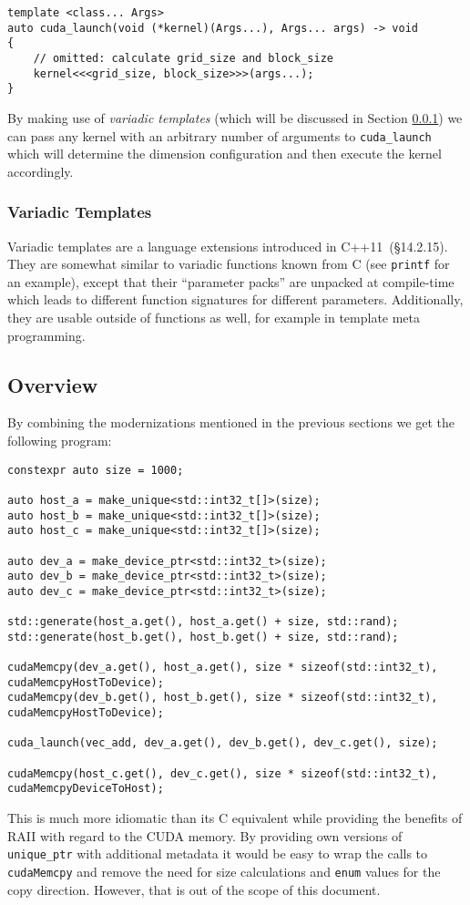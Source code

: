 \begin{lstlisting}
template <class... Args>
auto cuda_launch(void (*kernel)(Args...), Args... args) -> void
{
    // omitted: calculate grid_size and block_size
    kernel<<<grid_size, block_size>>>(args...);
}
\end{lstlisting}

By making use of \textit{variadic templates} (which will be discussed in Section \ref{vec_add:variadic_templates}) we can pass any kernel with an arbitrary number of arguments to \texttt{cuda\_launch} which will determine the dimension configuration and then execute the kernel accordingly.

\subsubsection{Variadic Templates}\label{vec_add:variadic_templates}

Variadic templates are a language extensions introduced in C++11~\cite{cpp11std}(§14.2.15). They are somewhat similar to variadic functions known from C (see \texttt{printf} for an example), except that their ``parameter packs'' are unpacked at compile-time which leads to different function signatures for different parameters. Additionally, they are usable outside of functions as well, for example in template meta programming.

\subsection{Overview}

By combining the modernizations mentioned in the previous sections we get the following program:

\begin{lstlisting}
constexpr auto size = 1000;

auto host_a = make_unique<std::int32_t[]>(size);
auto host_b = make_unique<std::int32_t[]>(size);
auto host_c = make_unique<std::int32_t[]>(size);

auto dev_a = make_device_ptr<std::int32_t>(size);
auto dev_b = make_device_ptr<std::int32_t>(size);
auto dev_c = make_device_ptr<std::int32_t>(size);

std::generate(host_a.get(), host_a.get() + size, std::rand);
std::generate(host_b.get(), host_b.get() + size, std::rand);

cudaMemcpy(dev_a.get(), host_a.get(), size * sizeof(std::int32_t), cudaMemcpyHostToDevice);
cudaMemcpy(dev_b.get(), host_b.get(), size * sizeof(std::int32_t), cudaMemcpyHostToDevice);

cuda_launch(vec_add, dev_a.get(), dev_b.get(), dev_c.get(), size);

cudaMemcpy(host_c.get(), dev_c.get(), size * sizeof(std::int32_t), cudaMemcpyDeviceToHost);
\end{lstlisting}

This is much more idiomatic than its C equivalent while providing the benefits of RAII with regard to the CUDA memory. By providing own versions of \texttt{unique\_ptr} with additional metadata it would be easy to wrap the calls to \texttt{cudaMemcpy} and remove the need for size calculations and \texttt{enum} values for the copy direction. However, that is out of the scope of this document.